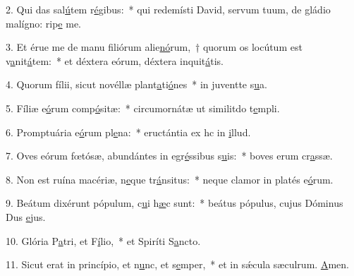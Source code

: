 2. Qui das sal\uline{ú}tem r\uline{é}gibus:~* qui redemísti David, servum tuum, de gládio malígno: rip\uline{e} me.\par 
3. Et érue me de manu filiórum alie\uline{nó}rum,~† quorum os locútum est v\uline{a}nit\uline{á}tem:~* et déxtera eórum, déxtera inquit\uline{á}tis.\par 
4. Quorum fílii, sicut novéllæ plant\uline{a}ti\uline{ó}nes~* in juventte s\uline{u}a.\par 
5. Fíliæ e\uline{ó}rum comp\uline{ó}sitæ:~* circumornátæ ut similitdo t\uline{e}mpli.\par 
6. Promptuária e\uline{ó}rum pl\uline{e}na:~* eructántia ex hc in \uline{i}llud.\par 
7. Oves eórum fœtósæ, abundántes in egr\uline{é}ssibus s\uline{u}is:~* boves erum cr\uline{a}ssæ.\par 
8. Non est ruína macériæ, n\uline{e}que tr\uline{á}nsitus:~* neque clamor in platés e\uline{ó}rum.\par 
9. Beátum dixérunt pópulum, c\uline{u}i h\uline{æ}c sunt:~* beátus pópulus, cujus Dóminus Dus \uline{e}jus.\par 
10. Glória P\uline{a}tri, et F\uline{í}lio,~* et Spiríti S\uline{a}ncto.\par 
11. Sicut erat in princípio, et n\uline{u}nc, et s\uline{e}mper,~* et in sǽcula sæculrum. \uline{A}men.\par 
